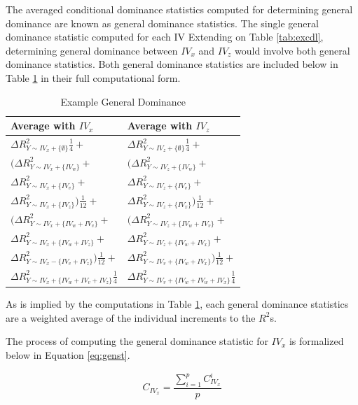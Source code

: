 \documentclass[ShortAfour,times,sageapa]{sagej}
\begin{document}
	The averaged conditional dominance statistics computed for determining general dominance are known as general dominance statistics. The single general dominance statistic computed for each IV
	Extending on Table \ref{tab:excdl}, determining general dominance between $IV_x$ and $IV_z$ would involve both general dominance statistics.
	Both general dominance statistics are included below in Table \ref{tab:exgen} in their full computational form.
	
		\begin{table}[h!]
		\centering
		\caption{\centering Example General Dominance}
		\begin{tabular}{ l l }
			Average with $IV_x$ & Average with $IV_z$ \\
			\hline
			$\Delta R^2_{Y \sim IV_x + \{\emptyset\}}\frac{1}{4} + $ & $\Delta R^2_{Y \sim IV_z + \{\emptyset\}}\frac{1}{4} +$ \\
			$(\Delta R^2_{Y \sim IV_x + \{IV_w\}} + $ & $(\Delta R^2_{Y \sim IV_z + \{IV_w\}} + $ \\
			$\Delta R^2_{Y \sim IV_x + \{IV_v\}} + $ & $\Delta R^2_{Y \sim IV_z + \{IV_v\}} + $ \\
			$\Delta R^2_{Y \sim IV_x + \{IV_z\}})\frac{1}{12} + $ & $\Delta R^2_{Y \sim IV_z + \{IV_x\}})\frac{1}{12} + $ \\
			$(\Delta R^2_{Y \sim IV_x + \{IV_w + IV_v\}} + $ & $(\Delta R^2_{Y \sim IV_z + \{IV_w + IV_v\}} + $ \\
			$\Delta R^2_{Y \sim IV_x + \{IV_w + IV_z\}} + $ & $\Delta R^2_{Y \sim IV_z + \{IV_w + IV_x\}} + $ \\
			$\Delta R^2_{Y \sim IV_x - \{IV_v + IV_z\}})\frac{1}{12} + $ & $\Delta R^2_{Y \sim IV_v + \{IV_w + IV_x\}})\frac{1}{12} +$ \\
			$\Delta R^2_{Y \sim IV_x + \{IV_w + IV_v + IV_z\}}\frac{1}{4}$ & $\Delta R^2_{Y \sim IV_v + \{IV_w + IV_w + IV_x\}}\frac{1}{4}$ \\
			\hline
		\end{tabular}
		\label{tab:exgen}
	\end{table}

	As is implied by the computations in Table \ref{tab:exgen}, each general dominance statistics are a weighted average of the individual increments to the $R^2$s.
	
	The process of computing the general dominance statistic for $IV_x$ is formalized below in Equation \ref{eq:genst}.
	
	\begin{equation}
		C_{IV_x} = \frac{\sum^{p}_{i=1} C^i_{IV_x}}{p}
		\label{eq:genst}
	\end{equation}
	
\end{document}
